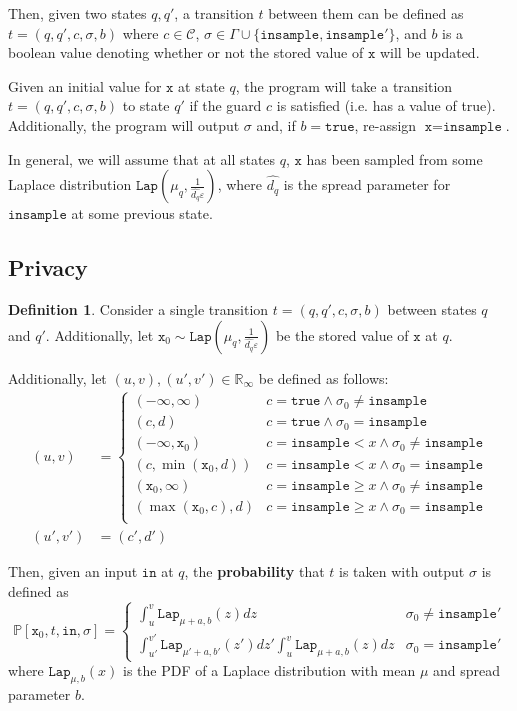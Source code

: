 \documentclass[12pt]{article}
\newcommand{\RR}{\mathbb{R}}
\newcommand{\PP}{\mathbb{P}}
\newcommand{\gguard}[1][x]{\texttt{insample}\geq #1}
\newcommand{\lguard}[1][x]{\texttt{insample} < #1}
\newcommand{\Lap}{\texttt{Lap}}
\theoremstyle{definition}
\newtheorem{defn}[thm]{Definition}
\begin{document}
Then, given two states $q, q'$, a transition $t$ between them can be defined as $t = (q, q', c, \sigma, b)$ where $c\in \mathcal{C}$, $\sigma\in \Gamma\cup\{\texttt{insample}, \texttt{insample}'\}$, and $b$ is a boolean value denoting whether or not the stored value of $\texttt{x}$ will be updated. 

Given an initial value for $\texttt{x}$ at state $q$, the program will take a transition $t=(q, q', c, \sigma, b)$ to state $q'$ if the guard $c$ is satisfied (i.e. has a value of true). Additionally, the program will output $\sigma$ and, if $b=\texttt{true}$, re-assign $\texttt{x}=\texttt{insample}$. 

In general, we will assume that at all states $q$, $\texttt{x}$ has been sampled from some Laplace distribution $\Lap(\mu_q, \frac{1}{\hat{d_{q}}\varepsilon})$, where $\hat{d_{q}}$ is the spread parameter for $\texttt{insample}$ at some previous state. 

\subsection{Privacy}

\begin{defn}
    Consider a single transition $t=(q, q', c, \sigma, b)$ between states $q$ and $q'$. Additionally, let $\texttt{x}_0\sim \Lap(\mu_q, \frac{1}{\hat{d_q}\varepsilon})$ be the stored value of $\texttt{x}$ at $q$. 
    
    Additionally, let $(u, v), (u', v')\in \RR_{\infty}$ be defined as follows:
    \begin{align*}
        (u, v) &= \begin{cases}
        (-\infty, \infty) & c=\texttt{true}\land \sigma_0 \neq \texttt{insample}\\
        (c, d) &c=\texttt{true}\land \sigma_0 = \texttt{insample}\\
        (-\infty, \texttt{x}_0) & c=\lguard\land \sigma_0 \neq \texttt{insample}\\
        (c, \min(\texttt{x}_0, d)) &c=\lguard\land \sigma_0 = \texttt{insample}\\
        (\texttt{x}_0, \infty) & c=\gguard\land \sigma_0 \neq \texttt{insample}\\
        (\max(\texttt{x}_0, c), d) &c=\gguard\land \sigma_0 = \texttt{insample}\\
    \end{cases}\\
    (u', v')& = (c', d')\end{align*}

    Then, given an input $\texttt{in}$ at $q$, the \textbf{probability} that $t$ is taken with output $\sigma$ is defined as \[
        \PP[\texttt{x}_0, t, \texttt{in}, \sigma] = \begin{cases}
            \int_u^v \Lap_{\mu+a, b}(z)dz & \sigma_0 \neq \texttt{insample}' \\
            \int_{u'}^{v'}\Lap_{\mu'+a, b'}(z')dz'\int_u^v \Lap_{\mu+a, b}(z)dz& \sigma_0 = \texttt{insample}'
        \end{cases}
    \]
    where $\Lap_{\mu, b}(x)$ is the PDF of a Laplace distribution with mean $\mu$ and spread parameter $b$.
\end{defn}
\end{document}
